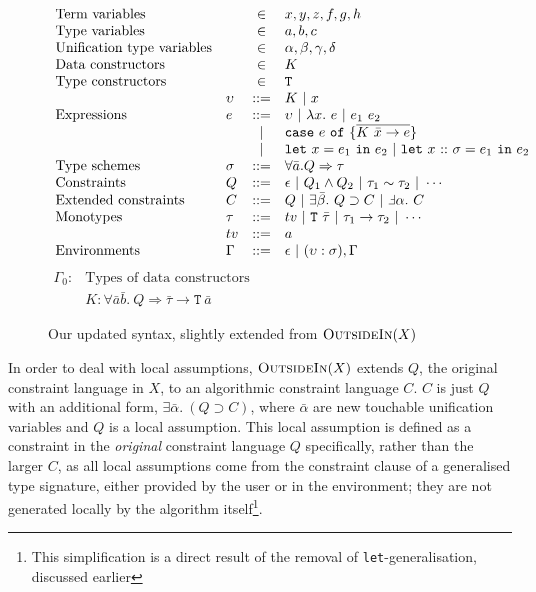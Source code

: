 \documentclass[a4paper]{jfp}
\newcommand{\outsidein}{\textsc{OutsideIn}(X)}
\begin{document}
\begin{figure}
	\caption{Our updated syntax, slightly extended from $\outsidein$}
   	\begin{displaymath}
	\begin{array}{llcl}
		\text{Term variables} & & \in & x, y, z, f, g, h \\
		\text{Type variables} & & \in & a, b, c \\
		\text{Unification type variables} & & \in & \alpha, \beta, \gamma, \delta \\
		\text{Data constructors} & & \in & K \\
		\text{Type constructors} & & \in & {\tt T} \\
		& \upsilon & ::= & K\ |\ x \\
		\text{Expressions} & e & ::=  & \upsilon\ |\ \lambda x.\ e\ |\ e_1\ e_2\ \\
		                   &   & | & \mathtt{case}\ e\ \mathtt{of}\ \{\overline{K\ \bar{x} \rightarrow e} \} \\
		                   &   & | & \mathtt{let}\ x = e_1\ \mathtt{in}\ e_2\ |\ \mathtt{let}\ x\ \mathtt{::}\ \sigma = e_1\ \mathtt{in}\ e_2\\
		\text{Type schemes} & \sigma & ::= & \forall \bar{a}. Q \Rightarrow \tau \\
		\text{Constraints} & Q & ::= & \epsilon\ |\ Q_1 \land Q_2\ |\ \tau_1 \sim \tau_2\ |\ \cdots  \\
		\text{Extended constraints} & C & ::= & Q\ |\ \exists \bar{\beta}.\ Q \supset C\ |\ \Finv \alpha.\ C \\
		\text{Monotypes} & \tau & ::= & tv\ |\ \mathtt{T}\ \bar{\tau}\ |\ \tau_1 \rightarrow \tau_2\ |\ \cdots \\
		 & tv & ::= & a \\
		\text{Environments} & \Gamma & ::= & \epsilon\ |\ (\upsilon : \sigma), \Gamma \\
	\end{array}	
	\end{displaymath}
	\begin{math}
		\begin{array}{ll}
		\Gamma_0: &  \text{Types of data constructors} \\
		& K : \forall\bar{a}\bar{b}.\ Q \Rightarrow \bar{\tau} \rightarrow \mathtt{T}\ \bar{a}
		\end{array}
		\end{math}
\end{figure}

In order to deal with local assumptions, $\outsidein$ extends $Q$, the original constraint language in $X$, to an algorithmic constraint language $C$. $C$ is just $Q$ with an additional form, $\exists\bar{\alpha}.\ (Q \supset C)$, where $\bar{\alpha}$ are new touchable unification variables and $Q$ is a local assumption. This local assumption is defined as a constraint in the \emph{original} constraint language $Q$ specifically, rather than the larger $C$, as all local assumptions come from the constraint clause of a generalised type signature, either provided by the user or in the environment; they are not generated locally by the algorithm itself\footnote{This simplification is a direct result of the removal of {\tt let}-generalisation, discussed earlier}. 
\end{document}
